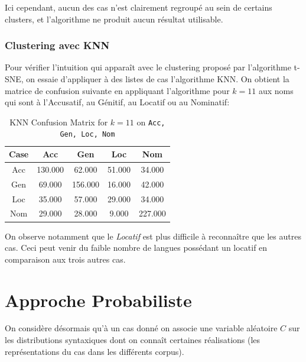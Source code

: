 \documentclass{cours}
\begin{document}
Ici cependant, aucun des cas n'est clairement regroupé au sein de certains clusters, et l'algorithme ne produit aucun résultat utilisable.


\subsubsection{Clustering avec KNN}\label{subsub:knn}
Pour vérifier l'intuition qui apparaît avec le clustering proposé par l'algorithme t-SNE, on essaie d'appliquer à des listes de cas l'algorithme KNN.
On obtient la matrice de confusion suivante en appliquant l'algorithme pour $k = 11$ aux noms qui sont à l'Accusatif, au Génitif, au Locatif ou au Nominatif:
\begin{table}[H]
	\centering
	\begin{tabular}{ccccc}
		Case & Acc & Gen & Loc & Nom\\
		\midrule
		Acc & 130.000 & 62.000 & 51.000 & 34.000\\
		Gen & 69.000 & 156.000 & 16.000 & 42.000\\
		Loc & 35.000 & 57.000 & 29.000 & 34.000\\
		Nom & 29.000 & 28.000 & 9.000 & 227.000\\
	\end{tabular}
	\caption{KNN Confusion Matrix for $k = 11$ on \texttt{Acc, Gen, Loc, Nom}}
\end{table}

On observe notamment que le \emph{Locatif} est plus difficile à reconnaître que les autres cas. Ceci peut venir du faible nombre de langues possédant un locatif en comparaison aux trois autres cas.

\section{Approche Probabiliste}\label{sec:probas}
On considère désormais qu'à un cas donné on associe une variable aléatoire $C$ sur les distributions syntaxiques dont on connaît certaines réalisations (les représentations du cas dans les différents corpus).
\end{document}

